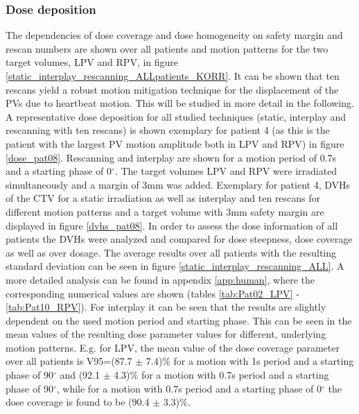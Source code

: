 \subsubsection{Dose deposition}
The dependencies of dose coverage and dose homogeneity on safety margin and rescan numbers are shown over all patients and motion patterns 
for the two target volumes, LPV and RPV, in figure \ref{static_interplay_rescanning_ALLpatients_KORR}. 
It can be shown that ten rescans yield a robust motion mitigation technique for the displacement of the PVs due to heartbeat motion. 
This will be studied in more detail in the following.\newline
\newline
A representative dose deposition for all studied techniques (static, interplay and rescanning with ten rescans) is shown exemplary for patient 
4 (as this is the patient with the largest PV motion amplitude both in LPV and RPV) in figure \ref{dose_pat08}. Rescanning and interplay 
are shown for a motion period of 0.7s and a starting phase of 0$^{\circ}$. The target volumes LPV and RPV were irradiated 
simultaneously and a margin of 3mm was added. \newline
\newline
Exemplary for patient 4, DVHs of the CTV for a static irradiation as well as interplay and ten rescans for different motion patterns and a 
target volume with 3mm safety margin are displayed in figure \ref{dvhs_pat08}. 
In order to assess the dose information of all patients the DVHs were analyzed and compared for dose steepness, dose coverage as well as 
over dosage. The average results over all patients with the resulting standard deviation can be seen in figure 
\ref{static_interplay_rescanning_ALL}. A more detailed analysis can be found in appendix \ref{app:human}, where the 
corresponding numerical values are shown (tables \ref{tab:Pat02_LPV} - \ref{tab:Pat10_RPV}).\newline
\newline
For interplay it can be seen that the results are slightly dependent on the used motion period and starting phase. This can be seen in the 
mean values of the resulting dose parameter values for different, underlying motion patterns. E.g. for LPV, the mean value of the dose 
coverage parameter over all patients is V95=(87.7 $\pm$ 7.4)\% for a motion with 1s period and a starting phase of 90$^{\circ}$ and 
(92.1 $\pm$ 4.3)\% for a motion with 0.7s period and a starting phase of 90$^{\circ}$, while for a motion with 0.7s period 
and a starting phase of 0$^{\circ}$ the dose coverage is found to be (90.4 $\pm$ 3.3)\%. 
